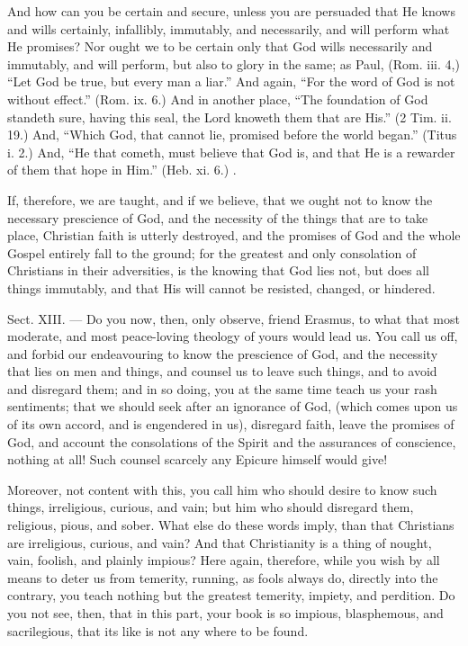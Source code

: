 And how can you be certain and secure, unless you are persuaded that He knows and wills certainly, infallibly, immutably, and necessarily, and will perform what He promises? Nor ought we to be certain only that God wills necessarily and immutably, and will perform, but also to glory in the same; as Paul, (Rom. iii. 4,) “Let God be true, but every man a liar.” And again, “For the word of God is not without effect.” (Rom. ix. 6.) And in another place, “The foundation of God standeth sure, having this seal, the Lord knoweth them that are His.” (2 Tim. ii. 19.) And, “Which God, that cannot lie, promised before the world began.” (Titus i. 2.) And, “He that cometh, must believe that God is, and that He is a rewarder of them that hope in Him.” (Heb. xi. 6.) .

If, therefore, we are taught, and if we believe, that we ought not to know the necessary prescience of God, and the necessity of the things that are to take place, Christian faith is utterly destroyed, and the promises of God and the whole Gospel entirely fall to the ground; for the greatest and only consolation of Christians in their adversities, is the knowing that God lies not, but does all things immutably, and that His will cannot be resisted, changed, or hindered.


Sect. XIII. — Do you now, then, only observe, friend Erasmus, to what that most moderate, and most peace-loving theology of yours would lead us. You call us off, and forbid our endeavouring to know the prescience of God, and the necessity that lies on men and things, and counsel us to leave such things, and to avoid and disregard them; and in so doing, you at the same time teach us your rash sentiments; that we should seek after an ignorance of God, (which comes upon us of its own accord, and is engendered in us), disregard faith, leave the promises of God, and account the consolations of the Spirit and the assurances of conscience, nothing at all! Such counsel scarcely any Epicure himself would give!

Moreover, not content with this, you call him who should desire to know such things, irreligious, curious, and vain; but him who should disregard them, religious, pious, and sober. What else do these words imply, than that Christians are irreligious, curious, and vain? And that Christianity is a thing of nought, vain, foolish, and plainly impious? Here again, therefore, while you wish by all means to deter us from temerity, running, as fools always do, directly into the contrary, you teach nothing but the greatest temerity, impiety, and perdition. Do you not see, then, that in this part, your book is so impious, blasphemous, and sacrilegious, that its like is not any where to be found.


